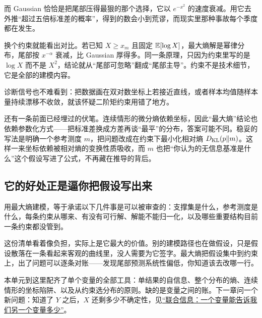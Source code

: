而 Gaussian 恰恰是把尾部压得最狠的那个选择，它以 \(e^{-x^2}\) 的速度衰减。用它去外推``超过五倍标准差的概率''，得到的数会小到荒谬，而现实里那种事故每个季度都在发生。

换个约束就能看出对比。若已知 \(X\ge x_m\) 且固定 \(\mathbb{E}[\log X]\)，最大熵解是幂律分布，尾部按 \(x^{-\alpha}\) 衰减，比 Gaussian 厚得多。同一条原理，只因为约束里写的是 \(\log X\) 而不是 \(X^2\)，结论就从``尾部可忽略''翻成``尾部主导''。约束不是技术细节，它是全部的建模内容。

诊断信号也不难看到：把数据画在双对数坐标上若接近直线，或者样本均值随样本量持续漂移不收敛，就该怀疑二阶矩约束用错了地方。

还有一条前面已经埋过的伏笔。连续情形的微分熵依赖坐标，因此``最大熵''结论也依赖参数化方式——把标准差换成方差再谈``最平''的分布，答案可能不同。稳妥的写法是明确一个参考测度 \(m\)，把问题改成在约束下最小化相对熵 \(D_{\mathrm{KL}}(p\Vert m)\)。这样一来坐标依赖被相对熵的变换性质吸收，而 \(m\) 也把``你认为的无信息基准是什么''这个假设写进了公式，不再藏在推导的背后。

\subsection{它的好处正是逼你把假设写出来}

用最大熵建模，等于承诺以下几件事是可以被审查的：支撑集是什么，参考测度是什么，每条约束从哪来、有没有可行解、解能不能归一化，以及哪些重要结构目前一条约束都没管到。

这份清单看着像负担，实际上是它最大的价值。别的建模路径也在做假设，只是假设散落在一条看起来客观的曲线里，没人需要为它签字。最大熵把假设集中到约束上，出了问题可以逐条对账——发现尾部预测系统性偏低，你知道该去改哪一行。

本单元到这里配齐了单个变量的全部工具：单结果的自信息、整个分布的熵、连续情形的坐标陷阱、以及从约束选分布的原则。缺的是变量之间的账。下一章问一个新问题：知道了 \(Y\) 之后，\(X\) 还剩多少不确定性，见\hyperref[ch:055]{``联合信息：一个变量能告诉我们另一个变量多少''}。
